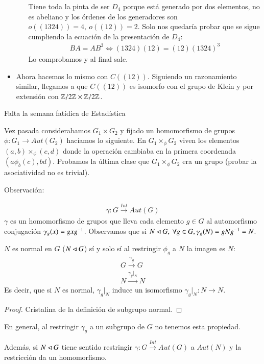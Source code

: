 \begin{ej}
\begin{itemize}
\begin{itemize}
			Tiene toda la pinta de ser $D_4$ porque está generado por dos elementos, no es abeliano y los órdenes de los generadores son $o((1324)) = 4,\ o((12)) = 2$. Solo nos quedaría probar que se sigue cumpliendo la ecuación de la presentación de $D_4$:
			\begin{align*}
			BA = AB^3 \iff (1324)(12) = (12)(1324)^3
			\end{align*}
			Lo comprobamos y al final sale.
		\end{itemize}
		
		\item Ahora hacemos lo mismo con $C((12))$. Siguiendo un razonamiento similar, llegamos a que $C((12))$ es isomorfo con el grupo de Klein y por extensión con $\mathbb{Z}/2\mathbb{Z} \times \mathbb{Z}/2\mathbb{Z}$.
	\end{itemize}
\end{ej}

Falta la semana fatídica de Estadística

Vez pasada considerabamos $G_1 \times G_2$ y fijado un homomorfismo de grupos $\phi: G_1 \to Aut(G_2)$ hacíamos lo siguiente. En $G_1 \times_{\phi} G_2$ viven los elementos $(a,b) \times_{\phi} (c,d)$ donde la operación cambiaba en la primera coordenada $(a \phi_b(c), bd)$. Probamos la última clase que $G_1 \times_{\phi} G_2$ era un grupo (probar la asociatividad no es trivial).


Observación:

\begin{align*}
\gamma: G \xrightarrow{Int} Aut(G)
\end{align*}
$\gamma$ es un homomorfismo de grupos que lleva cada elemento $g \in G$ al automorfismo conjugación $\gamma_g(x) = gxg^{-1}$. Observamos que si $N \lhd G,\ \forall g \in G, \gamma_g(N) = gNg^{-1} = N$.

\begin{pro}
	$N$ es normal en $G$ ($N \lhd G$) sí y solo sí al restringir $\phi_g$ a $N$ la imagen es $N$:
	\begin{align*}
	G \xrightarrow{\gamma_g} G \\
	N \xrightarrow{\gamma_g \vert_N} N
	\end{align*}
	Es decir, que si $N$ es normal, $\gamma_g\vert_N$ induce un isomorfismo $\gamma_g\vert_N : N \to N$.
\end{pro}

\begin{proof}
	Cristalina de la definición de subgrupo normal.
\end{proof}

En general, al restringir $\gamma_g$ a un subgrupo de $G$ no tenemos esta propiedad.

Además, si $N \lhd G$ tiene sentido restringir $\gamma: G \xrightarrow{Int} Aut(G)$ a $Aut(N)$ y la restricción da un homomorfismo.